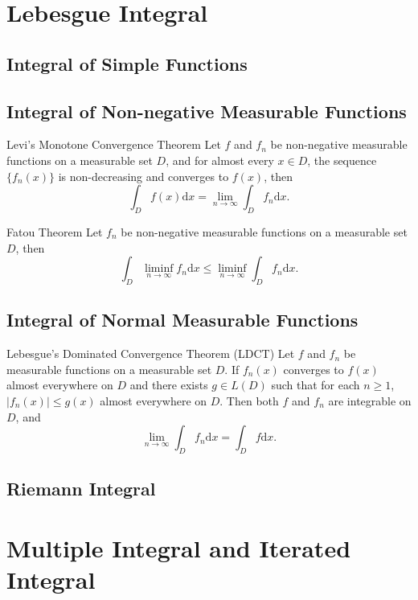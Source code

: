 

\section{Lebesgue Integral}

\subsection{Integral of Simple Functions}

\subsection{Integral of Non-negative Measurable Functions}

\begin{theorem}{Levi's Monotone Convergence Theorem}{}
  Let $f$ and $f_n$ be non-negative measurable functions on a measurable set
  $D$,
  and for almost every $x \in D$, the sequence $\{f_n(x)\}$ is non-decreasing
  and converges to $f(x)$, then
  \begin{equation}
    \int_D f(x)\mathrm{d} x = \lim \limits _{n \rightarrow \infty} \int_D f_n\mathrm{d} x.
  \end{equation}
\end{theorem}

\begin{theorem}{Fatou Theorem}{}
  Let $f_n$ be non-negative measurable functions on a measurable set $D$,
  then
  \begin{equation}
    \int_D \liminf \limits_{n \rightarrow \infty} f_n\mathrm{d} x
    \leq \liminf \limits_{n \rightarrow \infty} \int_D f_n\mathrm{d} x.
  \end{equation}
\end{theorem}

\subsection{Integral of Normal Measurable Functions}

\begin{theorem}{Lebesgue's Dominated Convergence Theorem (LDCT)}{}
  Let $f$ and $f_n$ be measurable functions on a measurable set $D$.
  If $f_n(x)$ converges to $f(x)$ almost everywhere on $D$ and
  there exists $g \in L(D)$ such that for each $n \geq 1$,
  $|f_n(x)| \leq g(x)$ almost everywhere on $D$.
  Then both $f$ and $f_n$ are integrable on $D$, and
  \begin{equation}
    \lim \limits _{n \rightarrow \infty} \int_D f_n\mathrm{d} x
    = \int_D f\mathrm{d}x.
  \end{equation}
\end{theorem}

\subsection{Riemann Integral}


\section{Multiple Integral and Iterated Integral}







